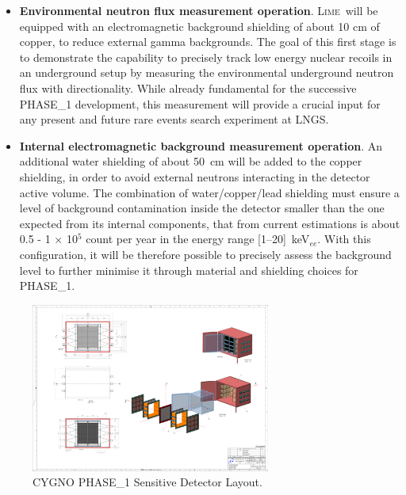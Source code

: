 \documentclass[physics,article,submit,moreauthors,pdftex]{Definitions/mdpi}
\newcommand{\lime}{{\textsc{Lime}}\xspace}
\begin{document}
\begin{itemize}
    \item {\bf Environmental neutron flux measurement operation}. \lime~will be equipped with an electromagnetic background shielding of about 10 cm of copper, to reduce external gamma backgrounds. The goal of this first stage is to demonstrate the capability to precisely track low energy nuclear recoils in an underground setup by measuring the environmental underground neutron flux with directionality. While already  fundamental for the successive PHASE\_1 development, this measurement will provide a crucial input for any present and future rare events search experiment at LNGS.
    \item {\bf Internal electromagnetic background measurement operation}. An additional water shielding of about 50~cm will be added to the copper shielding, in order to avoid external neutrons interacting in the detector active volume. The combination of water/copper/lead shielding must ensure a level of background contamination inside the detector smaller than the one expected from its internal components, that from current estimations is about 0.5 - 1 $\times$ 10$^5$ count per year in the energy range [1--20]~keV$_{ee}$. With this configuration, it will be therefore possible to precisely assess the background level to further minimise it through material and shielding choices for PHASE\_1. 
\end{itemize}

\begin{figure}[!t]
\centering
 \includegraphics[width=0.7\textwidth]{CygnoDetector.pdf}
 \caption{CYGNO PHASE\_1 Sensitive Detector Layout.}
 \label{fig:detector}
 \end{figure}
 
\end{document}
